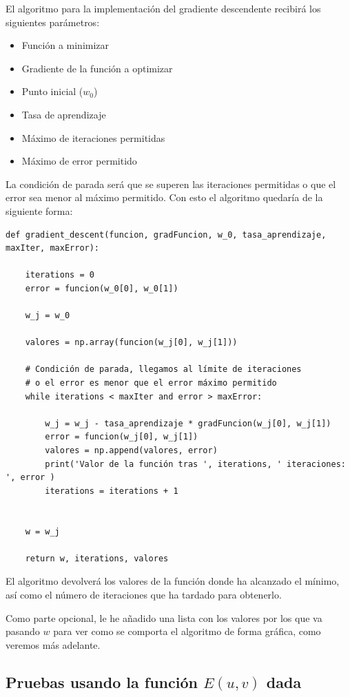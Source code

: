 \documentclass[12pt, spanish]{article}
\begin{document}
El algoritmo para la implementación del gradiente descendente recibirá los siguientes parámetros:

\begin{itemize}
	\item Función a minimizar
	\item Gradiente de la función a optimizar
	\item Punto inicial ($w_0$)
	\item Tasa de aprendizaje
	\item Máximo de iteraciones permitidas
	\item Máximo de error permitido
\end{itemize}


\newpage

La condición de parada será que se superen las iteraciones permitidas o que el error sea menor al máximo permitido. Con esto el algoritmo quedaría de la siguiente forma:

\begin{lstlisting}
def gradient_descent(funcion, gradFuncion, w_0, tasa_aprendizaje, maxIter, maxError):

	iterations = 0
	error = funcion(w_0[0], w_0[1])

	w_j = w_0

	valores = np.array(funcion(w_j[0], w_j[1]))

	# Condición de parada, llegamos al límite de iteraciones
	# o el error es menor que el error máximo permitido
	while iterations < maxIter and error > maxError:

		w_j = w_j - tasa_aprendizaje * gradFuncion(w_j[0], w_j[1])
		error = funcion(w_j[0], w_j[1])
		valores = np.append(valores, error)
		print('Valor de la función tras ', iterations, ' iteraciones: ', error )
		iterations = iterations + 1


	w = w_j

	return w, iterations, valores

\end{lstlisting}

El algoritmo devolverá los valores de la función donde ha alcanzado el mínimo, así como el número de iteraciones que ha tardado para obtenerlo.

Como parte opcional, le he añadido una lista con los valores por los que va pasando $w$ para ver como se comporta el algoritmo de forma gráfica, como veremos más adelante.

\newpage

\subsection{Pruebas usando la función $E(u,v)$ dada}
\end{document}
